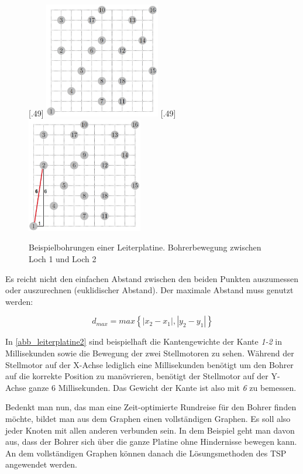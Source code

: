 \documentclass{article}
\begin{document}
\begin{figure}[h]
	\centering
	\subcaptionbox{\label{abb_leiterplatine}}[.49\linewidth]
	{
		\includegraphics[width=0.45\textwidth]{leiterplatine.jpg}
	}
	\hfill
	\subcaptionbox{\label{abb_leiterplatine2}}[.49\linewidth]
	{
		\includegraphics[width=0.45\textwidth]{leiterplatine2.jpg}
	}
	\caption{ Beispielbohrungen einer Leiterplatine.  Bohrerbewegung zwischen Loch 1 und Loch 2}
	\label{fig:leiterplatine}
\end{figure}

Es reicht nicht den einfachen Abstand zwischen den beiden Punkten auszumessen oder auszurechnen (euklidischer Abstand). Der maximale Abstand muss genutzt werden:

\[d_{max} = max\left\{ |x_2 - x_1|, |y_2 - y_1| \right\}\]

In \autoref{abb_leiterplatine2} sind beispielhaft die Kantengewichte der Kante \textit{1-2} in Millisekunden sowie die Bewegung der zwei Stellmotoren zu sehen. Während der Stellmotor auf der X-Achse lediglich eine Millisekunden benötigt um den Bohrer auf die korrekte Position zu manövrieren, benötigt der Stellmotor auf der Y-Achse ganze 6 Millisekunden. Das Gewicht der Kante ist also mit \textit{6} zu bemessen.

Bedenkt man nun, das man eine Zeit-optimierte Rundreise für den Bohrer finden möchte, bildet man aus dem Graphen einen vollständigen Graphen. Es soll also jeder Knoten mit allen anderen verbunden sein. In dem Beispiel geht man davon aus, dass der Bohrer sich über die ganze Platine ohne Hindernisse bewegen kann. An dem vollständigen Graphen können danach die Lösungsmethoden des TSP angewendet werden.
\newpage
\end{document}
